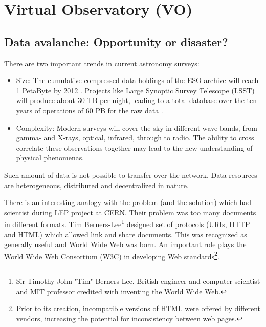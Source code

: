 

\ifpdf
    \graphicspath{{pic/}}
\else
    \graphicspath{{pic/}}
\fi

\chapter{ Virtual Observatory (VO)}


\section{ Data avalanche: Opportunity or disaster?}

There are two important trends in current astronomy surveys:

\begin{itemize}

  \item{Size:} The cumulative compressed data holdings of the ESO archive will
    reach 1 PetaByte by 2012 \cite{hanisch2010international}. Projects
    like Large Synoptic Survey Telescope (LSST) will produce about 30
    TB per night, leading to a total database over the ten years of
    operations of 60 PB for the raw data \cite{becla2006designing}.
   
  \item{Complexity:}  Modern surveys will cover the sky in different wave-bands, from
    gamma- and X-rays, optical, infrared, through to radio. The ability
    to cross correlate these observations together may lead to the new
    understanding of physical phenomenas. \cite{hanisch2010international}
\end{itemize}



Such amount of data is not possible to transfer over the network. Data
resources are heterogeneous, distributed and decentralized in nature.


There is an interesting analogy with the problem (and the solution)
which had scientist during LEP project at CERN.  Their problem was too
many documents in different formats. Tim Berners-Lee\footnote{ Sir
  Timothy John "Tim" Berners-Lee. British engineer and computer
  scientist and MIT professor credited with inventing the World Wide
  Web.} designed set of protocols (URIs, HTTP and HTML) which allowed
link and share documents\cite{berners1990worldwideweb}. This was
recognized as generally useful and World Wide Web was born. An
important role plays the World Wide Web Consortium (W3C) in developing
Web standards\footnote{Prior to its creation, incompatible versions
  of HTML were offered by different vendors, increasing the potential
  for inconsistency between web pages.}.
    
